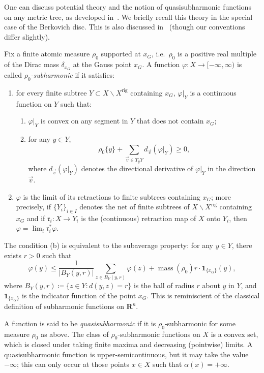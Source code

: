 \documentclass[10pt,reqno]{amsart}
\theoremstyle{plain}
\theoremstyle{definition}
\newcommand{\ds}{\displaystyle}
\numberwithin{equation}{section}
\DeclareMathOperator{\mass}{mass}
\DeclareMathOperator{\rig}{rig}
\begin{document}
One can discuss potential theory and the notion of quasisubharmonic functions on any metric tree, as developed in~\cite[\S2.5]{dynberko}. We briefly recall this theory in the special case of the Berkovich disc. This is also discussed in~\cite[\S 5]{baker-rumely} (though our conventions differ slightly). 

Fix a finite atomic measure $\rho_0$ supported at $x_G$, i.e.\ $\rho_0$ is a positive real multiple of the Dirac mass $\delta_{x_G}$ at the Gauss point $x_G$. A function $\varphi \colon X \to [-\infty, \infty)$ is called \emph{$\rho_0$-subharmonic} if it satisfies:
\begin{enumerate}
\item for every finite subtree $Y \subset X \backslash X^{\rig}$ containing $x_G$, $\varphi |_Y$ is a continuous function on $Y$ such that:
\begin{enumerate}
\item $\varphi|_Y$ is convex on any segment in $Y$ that does not contain $x_G$;
\item for any $y \in Y$, $$\rho_0 \{ y \} + \displaystyle\sum_{\vec{v} \in T_y Y} d_{\vec{v}} \left( \varphi|_Y \right) \geq 0,$$ where $d_{\vec{v}} \left( \varphi |_Y \right)$ denotes the directional derivative of $\varphi|_Y$ in the direction $\vec{v}$.
\end{enumerate}
\item $\varphi$ is the limit of its retractions to finite subtrees containing $x_G$; more precisely, if $\{ Y_{i} \}_{i \in I}$ denotes the net of finite subtrees of $X \backslash X^{\rig}$ containing $x_G$ and if $\mathfrak{r}_i \colon X \to Y_i$ is the (continuous) retraction map of $X$ onto $Y_i$, then $\varphi = \ds\lim_i \mathfrak{r}_i^*\varphi$.
\end{enumerate}
The condition (b) is equivalent to the subaverage property: for any $y \in Y$, there exists $r > 0$ such that 
$$
\varphi(y) \leq \frac{1}{|B_Y(y,r)|} \sum_{z \in B_Y(y,r)} \varphi(z) + \mass(\rho_0)r \cdot \mathbf{1}_{\{ x_G \}}(y),
$$
where $B_Y(y,r) \coloneqq \{ z \in Y \colon d(y,z) = r \}$ is the ball of radius $r$ about $y$ in $Y$, and $\mathbf{1}_{\{ x_G\}}$ is the indicator function of the point $x_G$. This is reminiscient of the classical definition of subharmonic functions on $\mathbf{R}^n$. 

A function is said to be \emph{quasisubharmonic} if it is $\rho_0$-subharmonic for some measure $\rho_0$ as above. The class of $\rho_0$-subharmonic functions on $X$ is a convex set, which is closed under taking finite maxima and decreasing (pointwise) limits. A quasisubharmonic function is upper-semicontinuous, but it may take the value $-\infty$; this can only occur at those points $x \in X$ such that $\alpha(x) = +\infty$.
\end{document}

